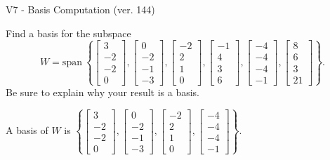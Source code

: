 \begin{exercise}
  \begin{exerciseTitle}V7 - Basis Computation (ver. 144)\end{exerciseTitle}
  \begin{exerciseStatement}
    Find a basis for the subspace 
\[W=\mathrm{span}\ \left\{\left[\begin{array}{r}
3 \\
-2 \\
-2 \\
0
\end{array}\right] , \left[\begin{array}{r}
0 \\
-2 \\
-1 \\
-3
\end{array}\right] , \left[\begin{array}{r}
-2 \\
2 \\
1 \\
0
\end{array}\right] , \left[\begin{array}{r}
-1 \\
4 \\
3 \\
6
\end{array}\right] , \left[\begin{array}{r}
-4 \\
-4 \\
-4 \\
-1
\end{array}\right] , \left[\begin{array}{r}
8 \\
6 \\
3 \\
21
\end{array}\right]\right\}.\]
 Be sure to explain why your result is a basis.


  \end{exerciseStatement}
  \begin{exerciseAnswer}
   A basis of \(W\) is  \(\left\{\left[\begin{array}{r}
3 \\
-2 \\
-2 \\
0
\end{array}\right] , \left[\begin{array}{r}
0 \\
-2 \\
-1 \\
-3
\end{array}\right] , \left[\begin{array}{r}
-2 \\
2 \\
1 \\
0
\end{array}\right] , \left[\begin{array}{r}
-4 \\
-4 \\
-4 \\
-1
\end{array}\right]\right\}\).
  


  \end{exerciseAnswer}
\end{exercise}